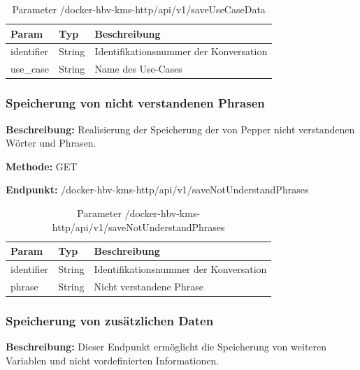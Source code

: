 \begin{table}[H]
    \label{table:/docker-hbv-kms-http/api/v1/saveUseCaseData}
    \caption{Parameter /docker-hbv-kms-http/api/v1/saveUseCaseData}
    \setlength{\tabcolsep}{3pt}
    \begin{tabular}{p{100pt}p{80pt}p{200pt}}
        \toprule
        Param      & Typ    & Beschreibung                           \\
        \midrule
        identifier & String & Identifikationsnummer der Konversation \\
        use\_case  & String & Name des Use-Cases                     \\
        \bottomrule
    \end{tabular}
\end{table}

\dotfill

\subsubsection{Speicherung von nicht verstandenen Phrasen}
\label{sec:api-saveNotUnderstandPhrases}
\textbf{Beschreibung:} Realisierung der Speicherung der von Pepper nicht verstandenen Wörter und Phrasen.

\textbf{Methode:} GET

\textbf{Endpunkt:} /docker-hbv-kms-http/api/v1/saveNotUnderstandPhrases

\begin{table}[H]
    \label{table:/docker-hbv-kms-http/api/v1/saveNotUnderstandPhrases}
    \caption{Parameter /docker-hbv-kms-http/api/v1/saveNotUnderstandPhrases}
    \setlength{\tabcolsep}{3pt}
    \begin{tabular}{p{100pt}p{80pt}p{200pt}}
        \toprule
        Param      & Typ    & Beschreibung                           \\
        \midrule
        identifier & String & Identifikationsnummer der Konversation \\
        phrase     & String & Nicht verstandene Phrase               \\
        \bottomrule
    \end{tabular}
\end{table}

\dotfill

\subsubsection{Speicherung von zusätzlichen Daten}
\label{sec:api-saveAttributeData}
\textbf{Beschreibung:} Dieser Endpunkt ermöglicht die Speicherung von weiteren Variablen und nicht vordefinierten Informationen.

